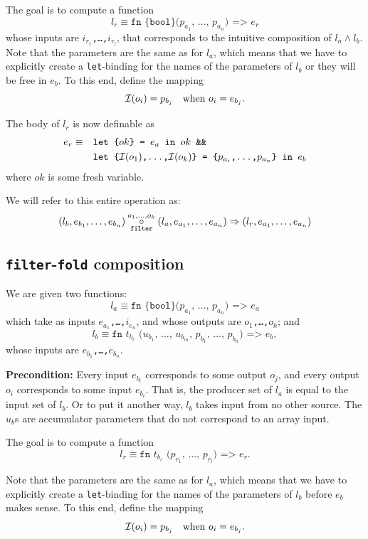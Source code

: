 The goal is to compute a function
\[
l_{r} \equiv \texttt{fn \{bool\} ($p_{a_{1}}$, \ldots, $p_{a_{n}}$)
=> $e_{r}$}
\]
whose inputs are \texttt{$i_{r_{1}}$,\ldots,$i_{r_{l}}$}, that
corresponds to the intuitive composition of $l_{a} \wedge l_{b}$.
Note that the parameters are the same as for $l_{a}$, which means that
we have to explicitly create a \texttt{let}-binding for the names of
the parameters of $l_{b}$ or they will be free in $e_{b}$.  To this end,
define the mapping
\[
\mathcal{I}(o_{i}) = p_{b_{j}} \quad \textrm{when $o_{i} = e_{b_{j}}$}.
\]

The body of $l_{r}$ is now definable as
\begin{align*}
e_{r} \equiv\quad&\texttt{let \{$ok$\} = $e_{a}$ in $ok$ \&\&} \\
& \texttt{let \{$\mathcal{I}(o_{1})$,\ldots,$\mathcal{I}(o_{k})$\} = \{$p_{a_{i}}$,\ldots,$p_{a_{n}}$\} in $e_{b}$}
\end{align*}
where $ok$ is some fresh variable.

We will refer to this entire operation as:
\[
(l_{b},e_{b_{1}},\ldots,e_{b_{n}}) \underset{\texttt{filter}}{\overset{o_{1},\ldots,o_{k}}\circ}(l_{a},e_{a_{1}},\ldots,e_{a_{n}}) \Rightarrow (l_{r},e_{a_{1}},\ldots,e_{a_{n}})
\]

\subsection{\texttt{filter}-\texttt{fold} composition}

We are given two functions:
\[
l_{a}\equiv\texttt{fn \{bool\} ($p_{a_{1}}$, \ldots, $p_{a_{n}}$) => $e_{a}$}
\]
which take as inputs \texttt{$e_{a_{1}}$,\ldots,$i_{e_{n}}$}, and whose
outputs are \texttt{$o_1$,\ldots,$o_k$}; and
\[
l_{b}\equiv\texttt{fn $t_{b_{r}}$ ($u_{b_{1}}$, \ldots, $u_{b_{m}}$, $p_{b_{1}}$, \ldots, $p_{b_{n}}$) => $e_{b}$},
\]
whose inputs are \texttt{$e_{b_{1}}$,\ldots,$e_{b_{n}}$}.

\textbf{Precondition:} Every input $e_{b_{i}}$ corresponds to some
output $o_{j}$, and every output $o_{i}$ corresponds to some input
$e_{b_{i}}$.  That is, the producer set of $l_{a}$ is equal to the
input set of $l_{b}$.  Or to put it another way, $l_{b}$ takes input
from no other source.  The $u_{b}$s are accumulator parameters that do
not correspond to an array input.

The goal is to compute a function
\[
l_{r} \equiv \texttt{fn $t_{b_{r}}$ ($p_{r_{1}}$, \ldots, $p_{r_{l}}$)
=> $e_{r}$}.
\]

Note that the parameters are the same as for $l_{a}$, which means that
we have to explicitly create a \texttt{let}-binding for the names of
the parameters of $l_{b}$ before $e_{b}$ makes sense.  To this end,
define the mapping
\[
\mathcal{I}(o_{i}) = p_{b_{j}} \quad \textrm{when $o_{i} = e_{b_{j}}$}.
\]

